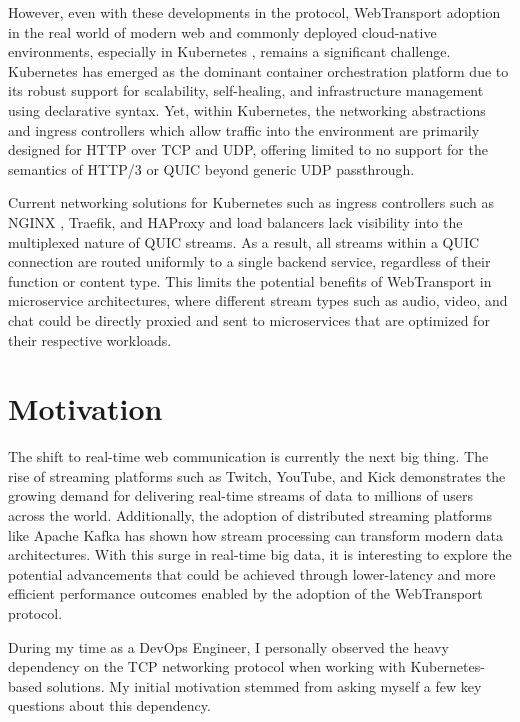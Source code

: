 However, even with these developments in the protocol, WebTransport adoption in the real world of modern web and commonly deployed cloud-native environments, especially in Kubernetes \cite{kubernetes-docs}, remains a significant challenge. Kubernetes has emerged as the dominant container orchestration platform due to its robust support for scalability, self-healing, and infrastructure management using declarative syntax. Yet, within Kubernetes, the networking abstractions and ingress controllers which allow traffic into the environment are primarily designed for HTTP over TCP and UDP, offering limited to no support for the semantics of HTTP/3 or QUIC beyond generic UDP passthrough.

Current networking solutions for Kubernetes such as ingress controllers such as NGINX \cite{nginx-ingress-docs}, Traefik, and HAProxy \cite{haproxy-k8s-docs} and load balancers lack visibility into the multiplexed nature of QUIC streams. As a result, all streams within a QUIC connection are routed uniformly to a single backend service, regardless of their function or content type. This limits the potential benefits of WebTransport in microservice architectures, where different stream types such as audio, video, and chat could be directly proxied and sent to microservices that are optimized for their respective workloads.




\section{Motivation}

The shift to real-time web communication is currently the next big thing. The rise of streaming platforms such as Twitch, YouTube, and Kick demonstrates the growing demand for delivering real-time streams of data to millions of users across the world. Additionally, the adoption of distributed streaming platforms like Apache Kafka \cite{kreps2011} has shown how stream processing can transform modern data architectures. With this surge in real-time big data, it is interesting to explore the potential advancements that could be achieved through lower-latency and more efficient performance outcomes enabled by the adoption of the WebTransport protocol.

During my time as a DevOps Engineer, I personally observed the heavy dependency on the TCP networking protocol when working with Kubernetes-based solutions. My initial motivation stemmed from asking myself a few key questions about this dependency.

